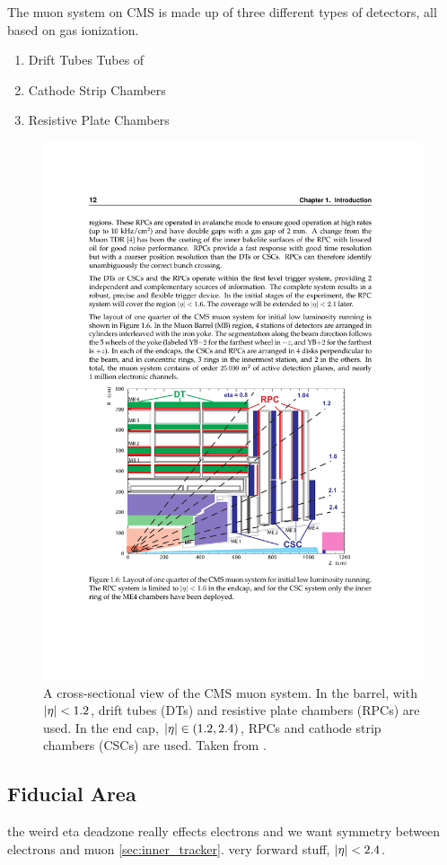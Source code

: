     The muon system on CMS is made up of three different types of detectors, all based on gas ionization.
    \begin{enumerate}
     \item{Drift Tubes} Tubes of 
     \item{Cathode Strip Chambers}
     \item{Resistive Plate Chambers}
    \end{enumerate}


    \begin{figure}[h!]
      \centering
      \includegraphics[width=.9\textwidth]{figures/muon_system.pdf}
      \caption{A cross-sectional view of the CMS muon system. In the barrel, with $\lvert \eta \rvert<1.2$, drift tubes (DTs) and resistive plate chambers (RPCs) are used. In the end cap, $\lvert \eta \rvert \in (1.2,2.4)$, RPCs and cathode strip chambers (CSCs) are used. Taken from \cite{cms_tdr}.}
      \label{fig:muon_system}
    \end{figure}

  \subsection{Fiducial Area} \label{sec:fiducial_area}
    the weird eta deadzone really effects electrons and we want symmetry between electrons and muon \ref{sec:inner_tracker}. very forward stuff, $\lvert \eta \rvert<2.4$. 
